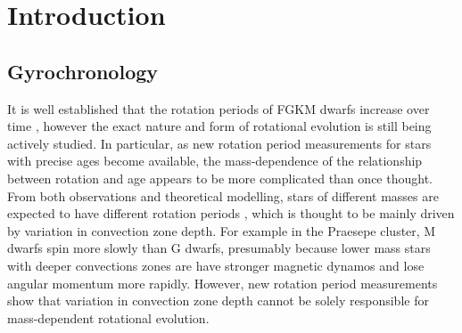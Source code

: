 \section{Introduction}

\subsection{Gyrochronology} It is well established that the rotation periods
of FGKM dwarfs increase over time \citep[\eg][]{schatzmann, weber,
skumanich1972 kawaler1989, pinsonneault1989, barnes2003, barnes2007,
barnes2010, meibom2011, meibom2015}, however the exact nature and form of
rotational evolution is still being actively studied.
In particular, as new rotation period measurements for stars with precise ages
become available, the mass-dependence of the relationship between rotation and
age appears to be more complicated than once thought.
From both observations and theoretical modelling, stars of different masses
are expected to have different rotation periods \citep[\eg][]{kraft1967,
matt2012}, which is thought to be mainly driven by variation in convection
zone depth.
For example in the Praesepe cluster, M dwarfs spin more slowly than G dwarfs,
presumably because lower mass stars with deeper convections zones are have
stronger magnetic dynamos and lose angular momentum more rapidly.
However, new rotation period measurements show that variation in convection
zone depth cannot be solely responsible for mass-dependent rotational
evolution.
